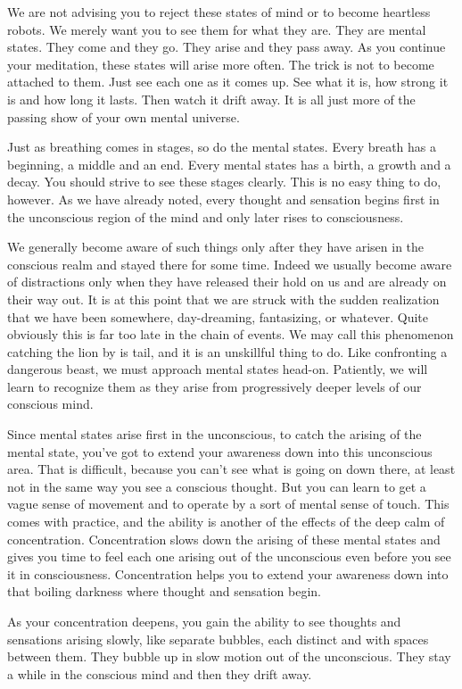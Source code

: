 We are not advising you to reject these states of mind or to become heartless
robots. We merely want you to see them for what they are. They are mental
states. They come and they go. They arise and they pass away. As you continue
your meditation, these states will arise more often. The trick is not to become
attached to them. Just see each one as it comes up. See what it is, how strong
it is and how long it lasts. Then watch it drift away. It is all just more of
the passing show of your own mental universe.

Just as breathing comes in stages, so do the mental states. Every breath has a
beginning, a middle and an end. Every mental states has a birth, a growth and a
decay. You should strive to see these stages clearly. This is no easy thing to
do, however. As we have already noted, every thought and sensation begins first
in the unconscious region of the mind and only later rises to consciousness.

We generally become aware of such things only after they have arisen in the
conscious realm and stayed there for some time.
Indeed we usually become aware of distractions only when they have released their hold on us and are already on their way out. It
is at this point that we are struck with the sudden realization that we have been somewhere, day-dreaming, fantasizing, or
whatever. Quite obviously this is far too late in the chain of events. We may call this phenomenon catching the lion by is tail, and
it is an unskillful thing to do. Like confronting a dangerous beast, we must approach mental states head-on. Patiently, we will
learn to recognize them as they arise from progressively deeper levels of our conscious mind.

Since mental states arise first in the unconscious, to catch the arising of the
mental state, you've got to extend your awareness down into this unconscious
area. That is difficult, because you can't see what is going on down there, at
least not in the same way you see a conscious thought. But you can learn to get
a vague sense of movement and to operate by a sort of mental sense of touch.
This comes with practice, and the ability is another of the effects of the deep
calm of concentration. Concentration slows down the arising of these mental
states and gives you time to feel each one arising out of the unconscious even
before you see it in consciousness. Concentration helps you to extend your
awareness down into that boiling darkness where thought and sensation begin.

As your concentration deepens, you gain the ability to see thoughts and
sensations arising slowly, like separate bubbles, each distinct and with spaces
between them. They bubble up in slow motion out of the unconscious. They stay a
while in the conscious mind and then they drift away.

